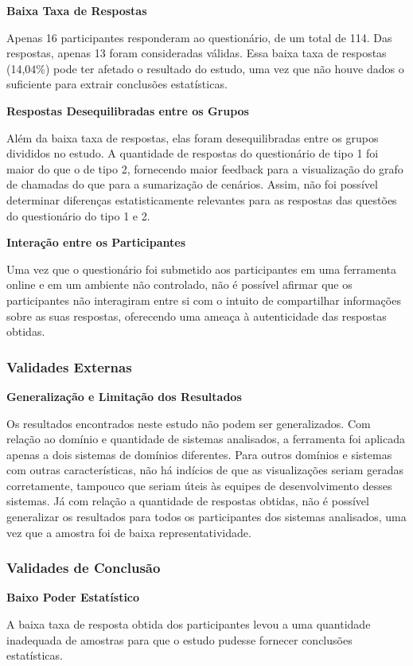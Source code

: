 \noindent \textbf{Baixa Taxa de Respostas}

Apenas 16 participantes responderam ao questionário, de um total de 114. Das respostas, apenas 13 foram consideradas válidas. Essa baixa taxa de respostas (14,04\%) pode ter afetado o resultado do estudo, uma vez que não houve dados o suficiente para extrair conclusões estatísticas.

\noindent \textbf{Respostas Desequilibradas entre os Grupos}

Além da baixa taxa de respostas, elas foram desequilibradas entre os grupos divididos no estudo. A quantidade de respostas do questionário de tipo 1 foi maior do que o de tipo 2, fornecendo maior feedback para a visualização do grafo de chamadas do que para a sumarização de cenários. Assim, não foi possível determinar diferenças estatisticamente relevantes para as respostas das questões do questionário do tipo 1 e 2.

\noindent \textbf{Interação entre os Participantes}

Uma vez que o questionário foi submetido aos participantes em uma ferramenta online e em um ambiente não controlado, não é possível afirmar que os participantes não interagiram entre si com o intuito de compartilhar informações sobre as suas respostas, oferecendo uma ameaça à autenticidade das respostas obtidas.

\subsubsection{Validades Externas}

\noindent \textbf{Generalização e Limitação dos Resultados}

Os resultados encontrados neste estudo não podem ser generalizados. Com relação ao domínio e quantidade de sistemas analisados, a ferramenta foi aplicada apenas a dois sistemas de domínios diferentes. Para outros domínios e sistemas com outras características, não há indícios de que as visualizações seriam geradas corretamente, tampouco que seriam úteis às equipes de desenvolvimento desses sistemas. Já com relação a quantidade de respostas obtidas, não é possível generalizar os resultados para todos os participantes dos sistemas analisados, uma vez que a amostra foi de baixa representatividade.

\subsubsection{Validades de Conclusão}

\noindent \textbf{Baixo Poder Estatístico}

A baixa taxa de resposta obtida dos participantes levou a uma quantidade inadequada de amostras para que o estudo pudesse fornecer conclusões estatísticas. 